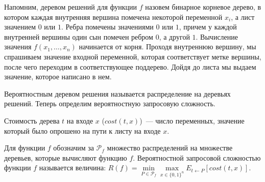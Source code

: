 

\setcounter{curtask}{40}







\begin{definition*}
    Напомним, деревом решений для функции $f$ назовем бинарное корневое дерево, в котором
каждая внутренняя вершина помечена некоторой переменной $x_i$, а лист значением $0$
или $1$. Ребра помечены значениями $0$ или $1$, причем у каждой внутренней вершины
один сын помечен ребром $0$, а другой $1$. Вычисление значения $f(x_1, \dots, x_n)$
начинается от корня. Проходя внутреннюю вершину, мы спрашиваем значение входной
переменной, которая соответствует метке вершины, после чего переходим в
соответствующее поддерево. Дойдя до листа мы выдаем значение, которое написано в нем.

Вероятностным деревом решения называется распределение на деревьях решений. Теперь
определим вероятностную запросовую сложность.

Стоимость дерева $t$ на входе $x$ (${cost}(t, x)$)~--- число переменных, значение
который было опрошено на пути к листу на входе $x$.

Для функции $f$ обозначим за $\mathcal{P}_f$ множество распределений на множестве
деревьев, которые вычисляют функцию $f$. Вероятностной запросовой сложностью функции
$f$ называется величина:
$R(f) = \min\limits_{P \in \mathcal{P}_f} \max\limits_{x \in \{0, 1\}^n}
E_{t \gets P}[{cost}(t, x)]$.

\end{definition*}

